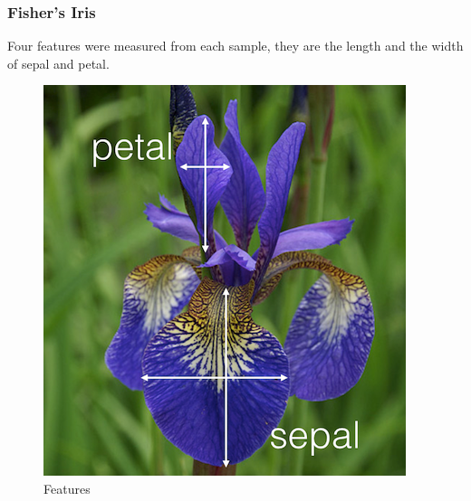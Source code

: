 \begin{frame}
\end{frame}

\begin{frame}
\frametitle{Fisher's Iris}
Four features were measured from each
sample, they are the length and the width of sepal and petal.
\begin{figure}[htbp]
\centering
\includegraphics[scale=.35]{graphics/iris_feature} \caption{Features}
\label{fig:Features}
\end{figure}
\end{frame}
